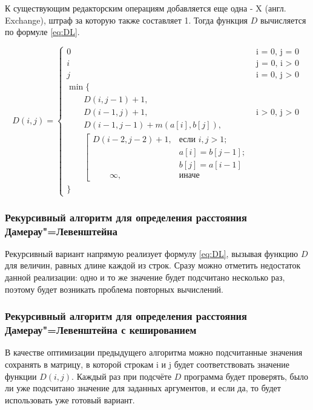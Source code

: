К существующим редакторским операциям добавляется еще одна - X (англ. Exchange), штраф за которую также составляет 1. Тогда функция $D$ вычисляется по формуле \ref{eq:DL}.

\begin{equation}
	\label{eq:DL}
	D(i, j) = \begin{cases}
		0 &\text{i = 0, j = 0}\\
		i &\text{j = 0, i > 0}\\
		j &\text{i = 0, j > 0}\\
		\min \lbrace \\
			\qquad D(i, j-1) + 1,\\
			\qquad D(i-1, j) + 1, &\text{i > 0, j > 0}\\
			\qquad D(i-1, j-1) + m(a[i], b[j]),\\
			\qquad \left[ \begin{array}{cc}D(i-2, j-2) + 1, &\text{если }i,j > 1;\\
			\qquad &\text{}a[i] = b[j-1]; \\
			\qquad &\text{}b[j] = a[i-1]\\
			\qquad \infty, & \text{иначе}\end{array}\right.\\
		\rbrace
	\end{cases}
\end{equation}

\subsubsection{Рекурсивный алгоритм для определения расстояния Дамерау"=Левенштейна}
Рекурсивный вариант напрямую реализует формулу \ref{eq:DL}, вызывая функцию $D$ для величин, равных длине каждой из строк. 
Сразу можно отметить недостаток данной реализации: одно и то же значение будет подсчитано не\-сколько раз, поэтому будет возникать проблема повторных вычислений.

\subsubsection{Рекурсивный алгоритм для определения расстояния Дамерау"=Левенштейна с кешированием}
В качестве оптимизации предыдущего алгоритма можно подсчитанные значения сохранять в матрицу, в которой строкам i и j будет соответствовать значение функции $D(i, j)$. Каждый раз при подсчёте $D$ программа будет проверять, было ли уже подсчитано значение для заданных аргументов, и если да, то будет использовать уже готовый вариант.

